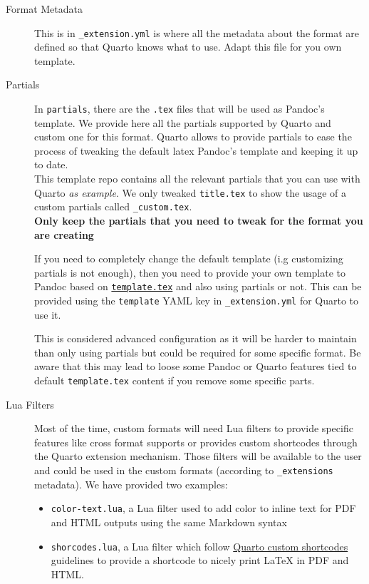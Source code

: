 \documentclass[
]{aft}
\providecommand{\tightlist}{%
  \setlength{\itemsep}{0pt}\setlength{\parskip}{0pt}}\usepackage{longtable,booktabs,array}
\begin{document}
\begin{description}
\item[Format Metadata]
This is in \texttt{\_extension.yml} is where all the metadata about the
format are defined so that Quarto knows what to use. Adapt this file for
you own template.
\item[Partials]
In \texttt{partials}, there are the \texttt{.tex} files that will be
used as Pandoc's template. We provide here all the partials supported by
Quarto and custom one for this format. Quarto allows to provide partials
to ease the process of tweaking the default latex Pandoc's template and
keeping it up to date.\\
This template repo contains all the relevant partials that you can use
with Quarto \emph{as example}. We only tweaked \texttt{title.tex} to
show the usage of a custom partials called \texttt{\_custom.tex}.\\
\textbf{Only keep the partials that you need to tweak for the format you
are creating}

If you need to completely change the default template (i.g customizing
partials is not enough), then you need to provide your own template to
Pandoc based on
\href{https://github.com/quarto-dev/quarto-cli/blob/main/src/resources/formats/pdf/pandoc/template.tex}{\texttt{template.tex}}
and also using partials or not. This can be provided using the
\texttt{template} YAML key in \texttt{\_extension.yml} for Quarto to use
it.

This is considered advanced configuration as it will be harder to
maintain than only using partials but could be required for some
specific format. Be aware that this may lead to loose some Pandoc or
Quarto features tied to default \texttt{template.tex} content if you
remove some specific parts.
\item[Lua Filters]
Most of the time, custom formats will need Lua filters to provide
specific features like cross format supports or provides custom
shortcodes through the Quarto extension mechanism. Those filters will be
available to the user and could be used in the custom formats (according
to \texttt{\_extensions} metadata). We have provided two examples:

\begin{itemize}
\tightlist
\item
  \texttt{color-text.lua}, a Lua filter used to add color to inline text
  for PDF and HTML outputs using the same Markdown syntax
\item
  \texttt{shorcodes.lua}, a Lua filter which follow
  \href{https://quarto.org/docs/authoring/shortcodes.html\#custom-shortcodes}{Quarto
  custom shortcodes} guidelines to provide a \texttt{} shortcode to
  nicely print LaTeX in PDF and HTML.
\end{itemize}


\end{description}
\end{document}
